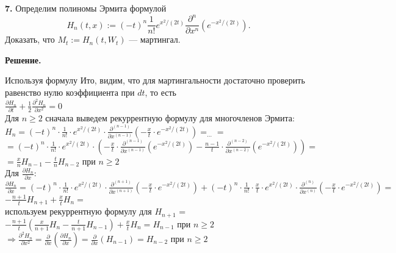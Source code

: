 \documentclass[12pt]{article}
\begin{document}
\bigskip
\noindent
{\bf 7.}  Определим полиномы Эрмита формулой 
$$
H_n(t,x):=(-t)^n \frac 1{n!}e^{x^2/(2t)}\frac {\partial^n}{\partial x^n} \left( e^{-x^2/(2t)} \right). 
$$
Доказать, что $M_t:=H_n(t,W_t)$ ---  мартингал. 

\smallskip
{\bf  Решение.} 

Используя формулу Ито, видим, что для мартингальности  достаточно проверить равенство нулю коэффициента при  $dt$, то есть\\
$\frac {\partial H_n}{\partial t} + \frac{1}{2}  \frac {\partial^2 H_n}{\partial x^2} = 0$\\

Для $n\geq2$ сначала выведем рекуррентную формулу для многочленов Эрмита:\\
$H_n=(-t)^n \cdot \frac{1}{n!}  \cdot e^{x^2/(2t)} \cdot  \frac {\partial^{(n-1)}}{\partial x^{(n-1)}} \left( - \frac{x}{t}  \cdot e^{-x^2/(2t)} \right)=_{...}=$\\
$=(-t)^n \cdot \frac{1}{n!} \cdot  e^{x^2/(2t)} \cdot  \left( - \frac{x}{t}  \cdot  \frac {\partial^{(n-1)}}{\partial x^{(n-1)}} \left(  e^{-x^2/(2t)} \right) - \frac{n-1}{t} \cdot   \frac {\partial^{(n-2)}}{\partial x^{(n-2)}} \left(  e^{-x^2/(2t)} \right)  \right)=$\\
$= \frac{x}{n} H_{n-1} - \frac{t}{n} H_{n-2}$ при $n\geq2$\\

Для $\frac {\partial H_n}{\partial x}:$\\
$\frac {\partial H_n}{\partial x} = 
(-t)^n \cdot \frac{1}{n!}  \cdot e^{x^2/(2t)} \cdot  \frac {\partial^{(n+1)}}{\partial x^{(n+1)}} \left( - \frac{x}{t}  \cdot e^{-x^2/(2t)} \right)
+
(-t)^n \cdot \frac{1}{n!}  \cdot \frac{x}{t}  \cdot e^{x^2/(2t)} \cdot  \frac {\partial^{(n)}}{\partial x^{(n)}} \left( - \frac{x}{t}  \cdot e^{-x^2/(2t)} \right)=$\\
$-\frac{n+1}{t} H_{n+1} + \frac{x}{t}H_n =  $ \\
используем рекуррентную формулу для $H_{n+1}$ = \\
$-\frac{n+1}{t} \left( \frac{x}{n+1}H_n -\frac{t}{n+1}H_{n-1} \right) + \frac{x}{t}H_n =H_{n-1}$ при $n\geq2$\\

$\Rightarrow \frac {\partial^2 H_n}{\partial x^2} =
 \frac {\partial }{\partial x} \left(  \frac {\partial H_n}{\partial x}  \right) =  
  \frac {\partial }{\partial x} \left(  H_{n-1} \right)  = H_{n-2}$ при $n\geq2$\\
  
\end{document}
